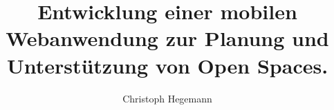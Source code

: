 \title{Entwicklung einer mobilen Webanwendung zur Planung und Unterstützung von Open Spaces.}
\author{Christoph Hegemann}

